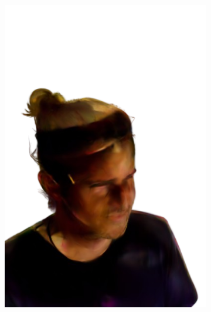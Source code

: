 \begin{figure}[ht]
\begin{subfigure}{0.2\linewidth}
		\includegraphics[width=\textwidth]{Figures/failed/cowboy/16_render-removebg-preview.png}
	\end{subfigure}
	\begin{subfigure}{0.2\linewidth}

\end{subfigure}
\end{figure}
